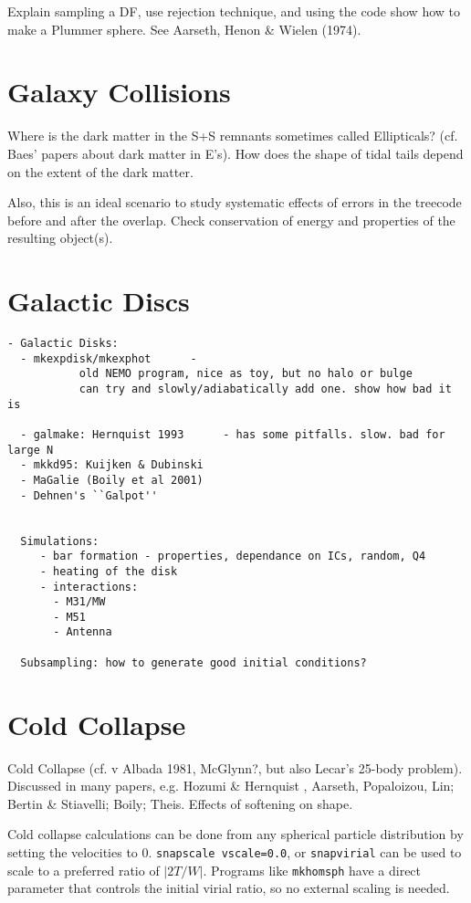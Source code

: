 {Explain sampling a DF, use rejection technique, and
using the code show how to make a Plummer sphere. See
Aarseth, Henon \& Wielen (1974).

\section{Galaxy Collisions}


Where is the dark matter in the S+S remnants sometimes called Ellipticals?
(cf. Baes' papers about dark matter in E's). How does the shape
of tidal tails depend on the extent of the dark matter.

Also, this is an ideal scenario to study systematic effects of errors
in the treecode before and after the overlap. Check conservation of energy
and properties of the resulting object(s).


\section{Galactic Discs}

\footnotesize\begin{verbatim}
- Galactic Disks:
  - mkexpdisk/mkexphot      - 
           old NEMO program, nice as toy, but no halo or bulge
           can try and slowly/adiabatically add one. show how bad it is

  - galmake: Hernquist 1993      - has some pitfalls. slow. bad for large N
  - mkkd95: Kuijken & Dubinski
  - MaGalie (Boily et al 2001) 
  - Dehnen's ``Galpot''


  Simulations:
     - bar formation - properties, dependance on ICs, random, Q4
     - heating of the disk
     - interactions:
       - M31/MW
       - M51
       - Antenna

  Subsampling: how to generate good initial conditions?

\end{verbatim}\normalsize



\section{Cold Collapse}


Cold Collapse (cf. v Albada 1981, McGlynn?, but also Lecar's 25-body problem).
Discussed in many papers, e.g. Hozumi \& Hernquist ,
Aarseth, Popaloizou, Lin;  Bertin \& Stiavelli; Boily; Theis. Effects
of softening on shape.

Cold collapse calculations can be done from any spherical particle
distribution by setting the velocities to 0. {\tt snapscale vscale=0.0},
or {\tt snapvirial} can be used to scale to a preferred ratio of $|2T/W|$.
Programs like {\tt mkhomsph} have a direct parameter that controls
the initial virial ratio, so no external scaling is needed.



}
